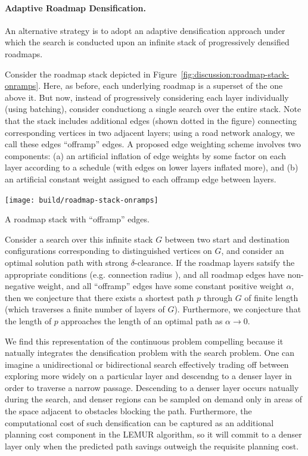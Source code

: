 \paragraph{Adaptive Roadmap Densification.}
An alternative strategy is to adopt an adaptive densification approach
under which the search is conducted upon an infinite stack of
progressively densified roadmaps.

Consider the roadmap stack depicted
in Figure~\ref{fig:discussion:roadmap-stack-onramps}.
Here, as before,
each underlying roadmap is a superset of the one above it.
But now,
instead of progressively considering each layer individually
(using batching),
consider conductiong a single search over the entire stack.
Note that the stack includes additional edges
(shown dotted in the figure)
connecting corresponding vertices in two adjacent layers;
using a road network analogy,
we call these edges ``offramp'' edges.
A proposed edge weighting scheme involves two components:
(a) an artificial inflation of edge weights by some factor
on each layer according to a schedule
(with edges on lower layers inflated more),
and (b) an artificial constant weight assigned to each offramp edge
between layers.


\begin{marginfigure}
   \centering
   \texttt{[image: build/roadmap-stack-onramps]}
   \caption{A roadmap stack with ``offramp'' edges.}
   \label{fig:discussion:roadmap-stack-onramps}
\end{marginfigure}

Consider a search over this infinite stack $G$
between two start and destination
configurations corresponding to distinguished vertices on $G$,
and consider an optimal solution path with strong $\delta$-clearance.
If the roadmap layers satsify the appropriate conditions
(e.g. connection radius
\citep{karaman2011samplingoptimal, janson2015deterministicsampling}),
and all roadmap edges have non-negative weight,
and all ``offramp'' edges have some constant positive weight $\alpha$,
then we conjecture that there exists a shortest path $p$ through $G$
of finite length (which traverses a finite number of layers of $G$).
Furthermore,
we conjecture that the length of $p$ approaches the length of an
optimal path as $\alpha \rightarrow 0$.

We find this representation of the continuous problem compelling
because it natually integrates the densification problem with
the search problem.
One can imagine a unidirectional or bidirectional search
effectively trading off between
exploring more widely on a particular layer
and descendng to a denser layer in order to traverse a narrow passage.
Descending to a denser layer occurs natually during the search,
and denser regions can be sampled on demand only in areas of the space
adjacent to obstacles blocking the path.
Furthermore,
the computational cost of such densification can be captured as
an additional planning cost component in the LEMUR algorithm,
so it will commit to a denser layer only when the predicted path
savings outweigh the requisite planning cost.


